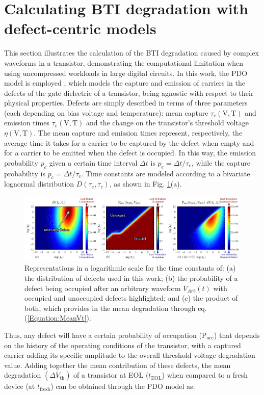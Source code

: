 \section{Calculating BTI degradation with defect-centric models}
\label{section:ModelingBTI}
This section illustrates the calculation of the BTI degradation caused by complex waveforms in a transistor, demonstrating the computational limitation when using uncompressed workloads in large digital circuits. In this work, the PDO model is employed \cite{martin-martinezProbabilisticDefectOccupancy2011}, which models the capture and emission of carriers in the defects of the gate dielectric of a transistor, being agnostic with respect to their physical properties. Defects are simply described in terms of three parameters (each depending on bias voltage and temperature): mean capture $\tau_c (\text{V},\text{T})$ and emission times $\tau_e (\text{V},\text{T})$ and the change on the transistor's threshold voltage $\eta (\text{V},\text{T})$. The mean capture and emission times represent, respectively, the average time it takes for a carrier to be captured by the defect when empty and for a carrier to be emitted when the defect is occupied. In this way, the emission probability $p_e$ given a certain time interval $\Delta t$ is $p_e=\Delta t / \tau_e$, while the capture probability is $p_c=\Delta t / \tau_c$. Time constants are modeled according to a bivariate lognormal distribution $D\left(\tau_e, \tau_c\right)$, as shown in Fig. \ref{fig:PDO_Intro}(a).
\begin{figure}[!t]
    \includegraphics[width=\textwidth,trim={0 0.5mm 0 0mm},clip]{images/ch2/plot_pocc_ddefect_together.pdf}
    \caption{Representations in a logarithmic scale for the time constants of: (a) the distribution of defects used in this work; (b) the probability of a defect being occupied after an arbitrary waveform $V_{Arb}(t)$ with occupied and unoccupied defects highlighted; and (c) the product of both, which provides in the mean degradation through eq. (\ref{Equation:MeanVt}).}
    \label{fig:PDO_Intro}
\end{figure}
Thus, any defect will have a certain probability of occupation ($\text{P}_{\text{occ}}$) that depends on the history of the operating conditions of the transistor, with a captured carrier adding its specific amplitude to the overall threshold voltage degradation value. Adding together the mean contribution of these defects, the mean degradation $(\overline{\Delta V_\text{th}})$ of a transistor at EOL ($t_\text{EOL}$) when compared to a fresh device (at $t_\text{fresh}$) can be obtained through the PDO model as:
